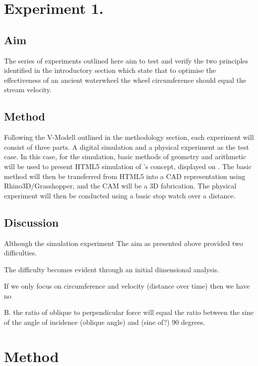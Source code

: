 \section{Experiment 1.}

\subsection{Aim}

The series of experiments outlined here aim to test and verify the two principles identified in the introductory section which state that to optimise the effectiveness of an ancient waterwheel the wheel circumference should equal the stream velocity.

\subsection{Method}

Following the V-Modell outlined in the methodology section, each experiment will consist of three parts. A digital simulation and a physical experiment as the test case. In this case, for the simulation, basic methods of geometry and arithmetic will be used to present HTML5 simulation of \citeyear{smeaton_experimental_1759}'s concept, displayed on \cite{maud_principle_2022}. The basic method will then be transferred from HTML5 into a CAD representation using Rhino3D/Grasshopper, and the CAM will be a 3D fabrication. The physical experiment will then be conducted using a basic stop watch over a distance.

\subsection{Discussion}

Although the simulation experiment The aim as presented above provided two difficulties. 


The difficulty becomes evident through an initial dimensional analysis. 

If we only focus on circumference and velocity (distance over time) then we have no 






B. the ratio of oblique to perpendicular force will equal the ratio between the sine of  the angle of incidence (oblique angle) and (sine of?) 90 degrees.  



\section{Method}




\printbibliography

